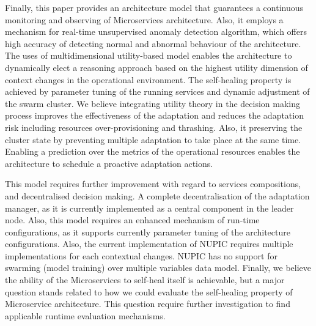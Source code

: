 \documentclass[graybox]{svmult}
\begin{document}
Finally, this paper provides an architecture model that guarantees a continuous monitoring and observing of Microservices architecture. Also, it employs a mechanism for real-time unsupervised anomaly detection algorithm, which offers high accuracy of detecting normal and abnormal behaviour of the architecture. The uses of multidimensional utility-based model enables the architecture to dynamically elect a reasoning approach based on the highest utility dimension of context changes in the operational environment. The self-healing property is achieved by parameter tuning of the running services and dynamic adjustment of the swarm cluster. We believe integrating utility theory in the decision making process improves the effectiveness of the adaptation and reduces the adaptation risk including resources over-provisioning and thrashing. Also, it preserving the cluster state by preventing multiple adaptation to take place at the same time. Enabling a prediction over the metrics of the operational resources enables the architecture to schedule a proactive adaptation actions. 

This model requires further improvement with regard to services compositions, and decentralised decision making. A complete decentralisation of the adaptation manager, as it is currently implemented as a central component in the leader node. Also, this model requires an enhanced mechanism of run-time configurations, as it supports currently parameter tuning of the architecture configurations. Also, the current implementation of NUPIC requires multiple implementations for each contextual changes. NUPIC has no support for swarming (model training) over multiple variables data model. Finally, we believe the ability of the Microservices to self-heal itself is achievable, but a major question stands related to how we could evaluate the self-healing property of Microservice architecture. This question require further investigation to find applicable runtime evaluation mechanisms.      




 


%
\end{document}
